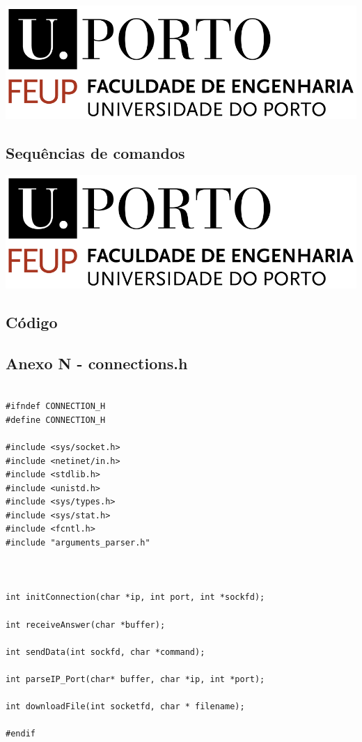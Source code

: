 \documentclass[11pt]{article}
\begin{document}
\includegraphics[width=\textwidth]{feup_logo.png}

\subsection{Sequências de comandos}

\includegraphics[width=\textwidth]{feup_logo.png}

\subsection{Código}

\subsection{ Anexo N - connections.h}

\begin{lstlisting}[style=CStyle]

#ifndef CONNECTION_H
#define CONNECTION_H

#include <sys/socket.h>
#include <netinet/in.h>
#include <stdlib.h>
#include <unistd.h>
#include <sys/types.h>
#include <sys/stat.h>
#include <fcntl.h>
#include "arguments_parser.h"



int initConnection(char *ip, int port, int *sockfd);

int receiveAnswer(char *buffer);

int sendData(int sockfd, char *command);

int parseIP_Port(char* buffer, char *ip, int *port);

int downloadFile(int socketfd, char * filename);

#endif

\end{lstlisting}
\end{document}
